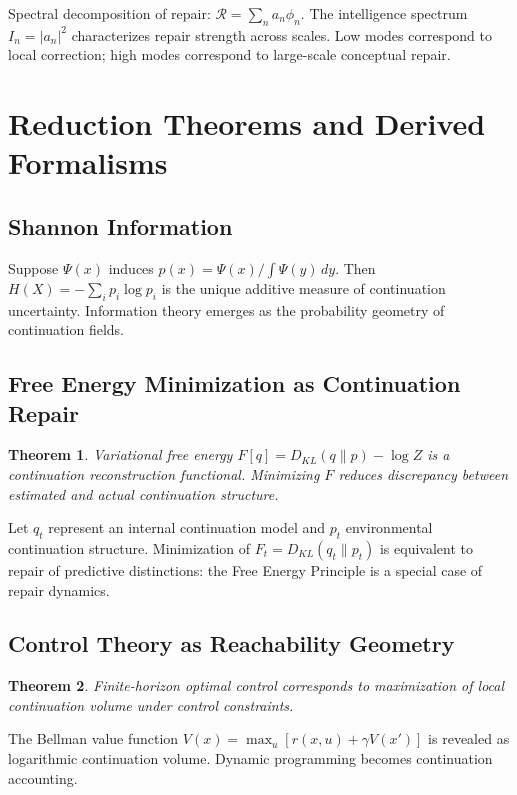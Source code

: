 \documentclass[12pt,a4paper]{article}
\newtheorem{theorem}{Theorem}[section]
\begin{document}
Spectral decomposition of repair: $\mathcal{R} = \sum_n a_n\phi_n$. The intelligence spectrum $I_n = |a_n|^2$ characterizes repair strength across scales. Low modes correspond to local correction; high modes correspond to large-scale conceptual repair.

\section{Reduction Theorems and Derived Formalisms}

\subsection{Shannon Information}

Suppose $\Psi(x)$ induces $p(x) = \Psi(x)/\int\Psi(y)\, dy$. Then $H(X) = -\sum_i p_i\log p_i$ is the unique additive measure of continuation uncertainty. Information theory emerges as the probability geometry of continuation fields.

\subsection{Free Energy Minimization as Continuation Repair}

\begin{theorem}
Variational free energy $F[q] = D_{KL}(q \| p) - \log Z$ is a continuation reconstruction functional. Minimizing $F$ reduces discrepancy between estimated and actual continuation structure.
\end{theorem}

Let $q_t$ represent an internal continuation model and $p_t$ environmental continuation structure. Minimization of $F_t = D_{KL}(q_t \| p_t)$ is equivalent to repair of predictive distinctions: the Free Energy Principle is a special case of repair dynamics.

\subsection{Control Theory as Reachability Geometry}

\begin{theorem}
Finite-horizon optimal control corresponds to maximization of local continuation volume under control constraints.
\end{theorem}

The Bellman value function $V(x) = \max_u [r(x,u) + \gamma V(x')]$ is revealed as logarithmic continuation volume. Dynamic programming becomes continuation accounting.
\end{document}
